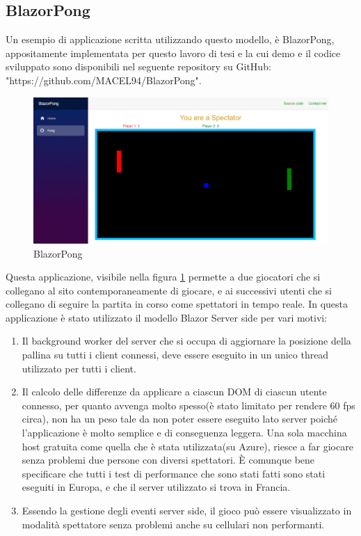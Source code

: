 \subsection{BlazorPong }\label{sez:bpong}
Un esempio di applicazione scritta utilizzando questo modello, \`e BlazorPong, appositamente implementata per questo lavoro di tesi e la cui demo e il codice sviluppato sono disponibili nel seguente repository su GitHub: "https://github.com/MACEL94/BlazorPong".

\begin{figure}[H]
	\centerline{\includegraphics[scale=0.3]{figure/BlazorPong.PNG}}
	\caption{BlazorPong}
	\label{fig:BlazorPong}
\end{figure}

Questa applicazione, visibile nella figura \ref{fig:BlazorPong} permette a due giocatori che si collegano al sito contemporaneamente di giocare, e ai successivi utenti che si collegano di seguire la partita in corso come spettatori in tempo reale.
In questa applicazione \`e stato utilizzato il modello Blazor Server side per vari motivi:
\begin{enumerate}
	\item Il background worker del server che si occupa di aggiornare la posizione della pallina su tutti i client connessi, deve essere eseguito in un unico thread utilizzato per tutti i client.
	\item Il calcolo delle differenze da applicare a ciascun DOM di ciascun utente connesso, per quanto avvenga molto spesso(\`e stato limitato per rendere 60 fps circa), non ha un peso tale da non poter essere eseguito lato server poich\'e l'applicazione \`e molto semplice e di conseguenza leggera.
	Una sola macchina host gratuita come quella che \`e stata utilizzata(su Azure), riesce a far giocare senza problemi due persone con diversi spettatori.
	\`E comunque bene specificare che tutti i test di performance che sono stati fatti sono stati eseguiti in Europa, e che il server utilizzato si trova in Francia.
	\item Essendo la gestione degli eventi server side, il gioco pu\`o essere visualizzato in modalit\`a spettatore senza problemi anche su cellulari non performanti.
\end{enumerate}

